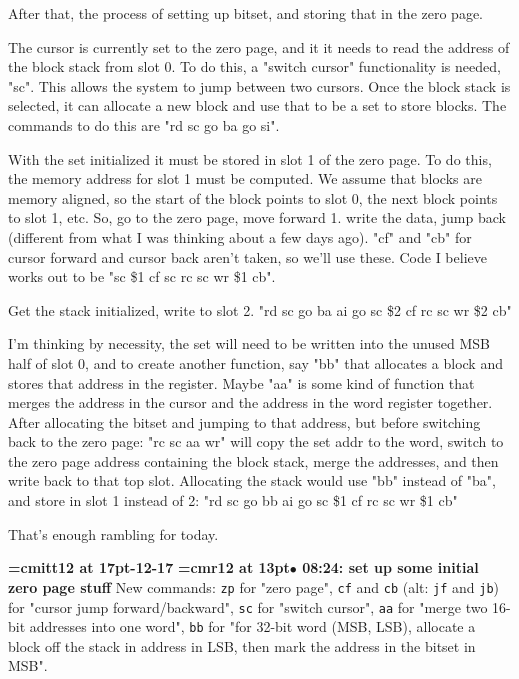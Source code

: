 After that, the process of setting up bitset, and storing that in the zero page.
\par

The cursor is currently set to the zero page, and it it needs to read the address of the block stack from slot 0. To do this, a "switch cursor" functionality is needed, "sc". This allows the system to jump between two cursors. Once the block stack is selected, it can allocate a new block and use that to be a set to store blocks. The commands to do this are "rd sc go ba go si".
\par

With the set initialized it must be stored in slot 1 of  the zero page. To do this, the memory address for slot 1 must be computed. We assume that blocks are memory aligned, so the start of the block points to slot 0, the next block points to slot 1, etc. So, go to the zero page, move forward 1. write the data, jump back (different from what I was thinking about a few days ago). "cf" and "cb" for cursor forward and cursor back aren't taken, so we'll use these. Code I believe works out to be "sc \$1 cf sc rc sc wr \$1 cb".
\par

Get the stack initialized, write to slot 2. "rd sc go ba ai go sc \$2 cf rc sc wr \$2 cb"
\par

I'm thinking by necessity, the set will need to be written into the unused MSB half of slot 0, and to create another function, say "bb" that allocates a block and stores that address in the register. Maybe "aa" is some kind of function that merges the address in the cursor and the address in the word register together. After allocating the bitset and jumping to that address, but before switching back to the zero page: "rc sc aa wr" will copy the set addr to the word, switch to the zero page address containing the block stack, merge the addresses, and then write back to that top slot. Allocating the stack would use "bb" instead of "ba", and store in slot 1 instead of 2: "rd sc go bb ai go sc \$1 cf rc sc wr \$1 cb"
\par

That's enough rambling for today.
\par

{\medskip\noindent\bf\font\titlefont=cmitt12 at 17pt-12-17}\medskip
{\smallskip\noindent\bf\font\titlefont=cmr12 at 13pt\titlefont $\bullet$ 08:24: set up some initial zero page stuff}\smallskip
New commands: {\tt zp} for "zero page", {\tt cf} and {\tt cb} (alt: {\tt jf} and {\tt jb}) for "cursor jump forward/backward", {\tt sc} for "switch cursor", {\tt aa} for "merge two 16-bit addresses into one word", {\tt bb} for "for 32-bit word (MSB, LSB), allocate a block off the stack in address in LSB, then mark the address in the bitset in MSB".
\par

